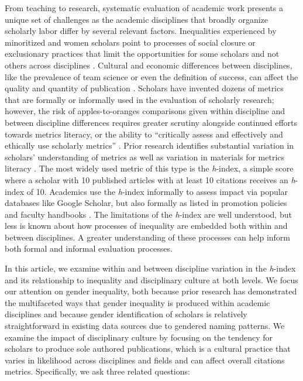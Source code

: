 \documentclass[
  10pt,
  letterpaper,
]{article}
\begin{document}
From teaching to research, systematic evaluation of academic work
presents a unique set of challenges as the academic disciplines that
broadly organize scholarly labor differ by several relevant factors.
Inequalities experienced by minoritized and women scholars point to
processes of social closure or exclusionary practices that limit the
opportunities for some scholars and not others across disciplines
\citep{hofstra_diversity_2020, lariviere_bibliometrics_2013, xie_sex_1998}.
Cultural and economic differences between disciplines, like the
prevalence of team science or even the definition of success, can affect
the quality and quantity of publication
\citep{fortunato_science_2018, gardner_conceptualizing_2009, stephan_how_2012}.
Scholars have invented dozens of metrics that are formally or informally
used in the evaluation of scholarly research; however, the risk of
apples-to-oranges comparisons given within discipline and between
discipline differences requires greater scrutiny
\citep{hicks_bibliometrics_2015, ioannidis_standardized_2019} alongside
continued efforts towards metrics literacy, or the ability to
``critically assess and effectively and ethically use scholarly
metrics'' \citep{maggio_becoming_2022}. Prior research identifies
substantial variation in scholars' understanding of metrics
\citep{hammarfelt_conflicting_2018, kamrani_researchers_2021, rousseau_becoming_2018}
as well as variation in materials for metrics literacy
\citep{maggio_becoming_2022}. The most widely used metric of this type
is the \emph{h}-index, a simple score where a scholar with 10 published
articles with at least 10 citations receives an \emph{h}-index of 10.
Academics use the \emph{h}-index informally to assess impact via popular
databases like Google Scholar, but also formally as listed in promotion
policies and faculty handbooks \citep{merga_should_2020}. The
limitations of the \emph{h}-index are well understood, but less is known
about how processes of inequality are embedded both within and between
disciplines. A greater understanding of these processes can help inform
both formal and informal evaluation processes.

In this article, we examine within and between discipline variation in
the \emph{h}-index and its relationship to inequality and disciplinary
culture at both levels. We focus our attention on gender inequality,
both because prior research has demonstrated the multifaceted ways that
gender inequality is produced within academic disciplines
\citep{fox_gender_2005, fox_gender_2017, grant_revisiting_2000, long_scientific_1995, morgan_unequal_2021}
and because gender identification of scholars is relatively
straightforward in existing data sources due to gendered naming
patterns. We examine the impact of disciplinary culture by focusing on
the tendency for scholars to produce sole authored publications, which
is a cultural practice that varies in likelihood across disciplines and
fields and can affect overall citations metrics. Specifically, we ask
three related questions:
\end{document}
